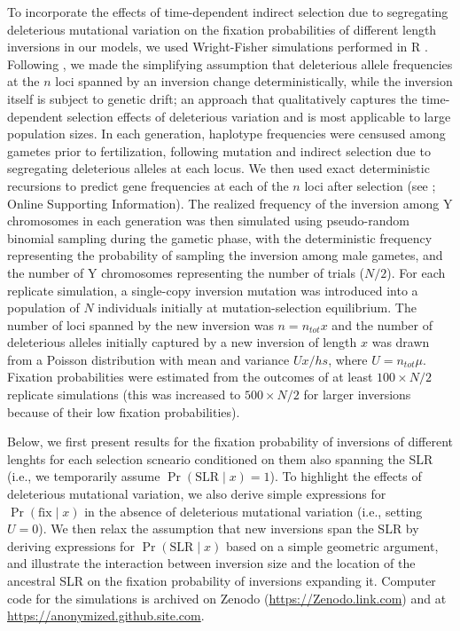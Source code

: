\documentclass{article}[12pt]
\begin{document}
To incorporate the effects of time-dependent indirect selection due to segregating deleterious mutational variation on the fixation probabilities of different length inversions in our models, we used Wright-Fisher simulations performed in R \citep{RSoftware}. Following \citet{Olito-etal-2022}, we made the simplifying assumption that deleterious allele frequencies at the $n$ loci spanned by an inversion change deterministically, while the inversion itself is subject to genetic drift; an approach that qualitatively captures the time-dependent selection effects of deleterious variation and is most applicable to large population sizes. In each generation, haplotype frequencies were censused among gametes prior to fertilization, following mutation and indirect selection due to segregating deleterious alleles at each locus. We then used exact deterministic recursions to predict gene frequencies at each of the $n$ loci after selection (see \citealt{Olito-etal-2022}; Online Supporting Information). The realized frequency of the inversion among Y chromosomes in each generation was then simulated using pseudo-random binomial sampling during the gametic phase, with the deterministic frequency representing the probability of sampling the inversion among male gametes, and the number of Y chromosomes representing the number of trials ($N/2$). For each replicate simulation, a single-copy inversion mutation was introduced into a population of $N$ individuals initially at mutation-selection equilibrium. The number of loci spanned by the new inversion was $n = n_{tot} x$ and the number of deleterious alleles initially captured by a new inversion of length $x$ was drawn from a Poisson distribution with mean and variance $U x/hs$, where $U = n_{tot} \mu$. Fixation probabilities were estimated from the outcomes of at least $100 \times N/2$ replicate simulations (this was increased to $500 \times N/2$ for larger inversions because of their low fixation probabilities).

Below, we first present results for the fixation probability of inversions of different lenghts for each selection scneario conditioned on them also spanning the SLR (i.e., we temporarily assume $\Pr(\text{SLR} \mid x) = 1$). To highlight the effects of deleterious mutational variation, we also derive simple expressions for $\Pr(\text{fix} \mid x)$ in the absence of deleterious mutational variation (i.e., setting $U = 0$). We then relax the assumption that new inversions span the SLR by deriving expressions for $\Pr(\text{SLR} \mid x)$ based on a simple geometric argument, and illustrate the interaction between inversion size and the location of the ancestral SLR on the fixation probability of inversions expanding it. Computer code for the simulations is archived on Zenodo (\url{https://Zenodo.link.com}) and at \url{https://anonymized.github.site.com}. %
\end{document}
